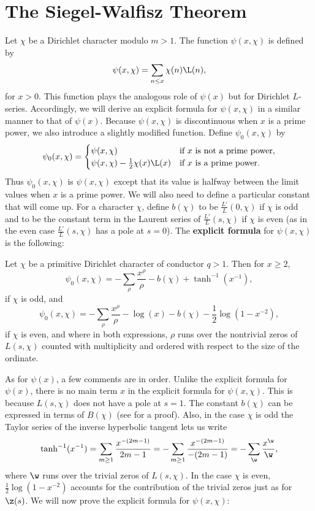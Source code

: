   \section{The Siegel-Walfisz Theorem}
    Let $\chi$ be a Dirichlet character modulo $m > 1$. The function $\psi(x,\chi)$ is defined by
    \[
      \psi(x,\chi) = \sum_{n \le x}\chi(n)\L(n),
    \]
    for $x > 0$. This function plays the analogous role of $\psi(x)$ but for Dirichlet $L$-series. Accordingly, we will derive an explicit formula for $\psi(x,\chi)$ in a similar manner to that of $\psi(x)$. Because $\psi(x,\chi)$ is discontinuous when $x$ is a prime power, we also introduce a slightly modified function. Define $\psi_{0}(x,\chi)$ by
    \[
      \psi_{0}(x,\chi) = \begin{cases} \psi(x,\chi) & \text{if $x$ is not a prime power}, \\ \psi(x,\chi)-\frac{1}{2}\chi(x)\L(x) & \text{if $x$ is a prime power}. \end{cases}
    \]
    Thus $\psi_{0}(x,\chi)$ is $\psi(x,\chi)$ except that its value is halfway between the limit values when $x$ is a prime power. We will also need to define a particular constant that will come up. For a character $\chi$, define $b(\chi)$ to be $\frac{L'}{L}(0,\chi)$ if $\chi$ is odd and to be the constant term in the Laurent series of $\frac{L'}{L}(s,\chi)$ if $\chi$ is even (as in the even case $\frac{L'}{L}(s,\chi)$ has a pole at $s = 0$). The \textbf{explicit formula} for $\psi(x,\chi)$ is the following:

    \begin{theorem}
      Let $\chi$ be a primitive Dirichlet character of conductor $q > 1$. Then for $x \ge 2$,
      \[
        \psi_{0}(x,\chi) = -\sum_{\rho}\frac{x^{\rho}}{\rho}-b(\chi)+\tanh^{-1}(x^{-1}),
      \]
      if $\chi$ is odd, and
      \[
        \psi_{0}(x,\chi) = -\sum_{\rho}\frac{x^{\rho}}{\rho}-\log(x)-b(\chi)-\frac{1}{2}\log(1-x^{-2}),
      \]
      if $\chi$ is even, and where in both expressions, $\rho$ runs over the nontrivial zeros of $L(s,\chi)$ counted with multiplicity and ordered with respect to the size of the ordinate.
    \end{theorem}

    As for $\psi(x)$, a few comments are in order. Unlike the explicit formula for $\psi(x)$, there is no main term $x$ in the explicit formula for $\psi(x,\chi)$. This is because $L(s,\chi)$ does not have a pole at $s = 1$. The constant $b(\chi)$ can be expressed in terms of $B(\chi)$ (see \cite{davenport1980multiplicative} for a proof). Also, in the case $\chi$ is odd the Taylor series of the inverse hyperbolic tangent lets us write
    \[
      \tanh^{-1}(x^{-1}) = \sum_{m \ge 1}\frac{x^{-(2m-1)}}{2m-1} = -\sum_{m \ge 1}\frac{x^{-(2m-1)}}{-(2m-1)} = -\sum_{\w}\frac{x^{\w}}{\w},
    \]
    where $\w$ runs over the trivial zeros of $L(s,\chi)$. In the case $\chi$ is even, $\frac{1}{2}\log(1-x^{-2})$ accounts for the contribution of the trivial zeros just as for $\z(s)$. We will now prove the explicit formula for $\psi(x,\chi)$:

